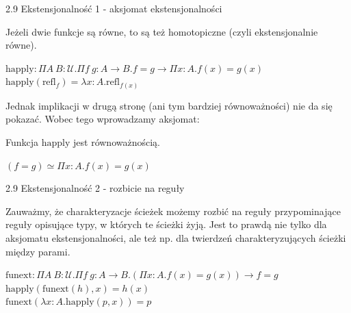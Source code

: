 \documentclass{beamer}
\newcommand{\U}{\mathcal{U}}
\newcommand{\refl}[1]{\text{refl}_{#1}}
\newcommand{\happly}{\text{happly}}
\newcommand{\funext}{\text{funext}}
\begin{document}
\begin{frame}{2.9 Ekstensjonalność 1 - aksjomat ekstensjonalności}

Jeżeli dwie funkcje są równe, to są też homotopiczne (czyli ekstensjonalnie równe).

\begin{definition}[2.9.2]
$\happly: \Pi A\ B : \U. \Pi f\ g : A \to B. f = g \to \Pi x : A. f(x) = g(x)$ \\
$\happly(\refl{f}) = \lambda x : A. \refl{f(x)}$
\end{definition}

Jednak implikacji w drugą stronę (ani tym bardziej równoważności) nie da się pokazać. Wobec tego wprowadzamy aksjomat:

\begin{definition}
Funkcja $\happly$ jest równoważnością.
\end{definition}

\begin{corollary}
$(f = g) \simeq \Pi x : A. f(x) = g(x)$
\end{corollary}

\end{frame}

\begin{frame}{2.9 Ekstensjonalność 2 - rozbicie na reguły}

Zauważmy, że charakteryzacje ścieżek możemy rozbić na reguły przypominające reguły opisujące typy, w których te ścieżki żyją. Jest to prawdą nie tylko dla aksjomatu ekstensjonalności, ale też np. dla twierdzeń charakteryzujących ścieżki między parami.

\begin{corollary}
$\funext : \Pi A\ B : \U. \Pi f\ g : A \to B. (\Pi x : A. f(x) = g(x)) \to f = g$ \\

$\happly(\funext(h), x) = h(x)$ \\

$\funext(\lambda x : A. \happly(p, x)) = p$
\end{corollary}

\end{frame}
\end{document}
